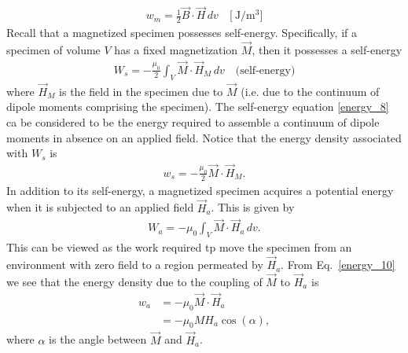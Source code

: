 \documentclass[12pt,a4paper,oneside]{book}
\begin{document}
\begin{onehalfspace}
\begin{equation}\label{energy_7}
	\boxed{	\begin{aligned}
			w_m = \frac{1}{2}\vec{B}\cdot \vec{H}\,dv \quad\Big[\SI{}{\joule\per\cubic\meter}\Big]
	\end{aligned}}
\end{equation}   
Recall that a magnetized specimen possesses self-energy. Specifically, if a specimen of volume $V$ has a fixed magnetization $\vec{M}$, then it possesses a self-energy 
\begin{equation}\label{energy_8}
	\boxed{	\begin{aligned}
			W_s = -\frac{\mu_0}{2}\int_{V}\vec{M}\cdot \vec{H}_M\,dv \quad\Big(\text{self-energy}\Big)
	\end{aligned}}
\end{equation} 
where $\vec{H}_M$ is the field in the specimen due to $\vec{M}$ (i.e. due to the continuum of dipole moments comprising the specimen). The self-energy equation \ref{energy_8} ca be considered to be the energy required to assemble a continuum of dipole moments in absence on an applied field. Notice that the energy density associated with $W_s$ is
\begin{equation}\label{energy_9}
	\begin{aligned}
			w_s = -\frac{\mu_0}{2}\vec{M}\cdot \vec{H}_M.
	\end{aligned}
\end{equation}
In addition to its self-energy, a magnetized specimen acquires a potential energy when it is subjected to an applied field $\vec{H}_a$. This is given by
\begin{equation}\label{energy_10}
\boxed{	\begin{aligned}
		W_a = -\mu_0\int_{V}\vec{M}\cdot \vec{H}_a\,dv.
	\end{aligned}}
\end{equation}
This can be viewed as the work required tp move the specimen from an environment with zero field to a region permeated by $\vec{H}_a$. From Eq.~\eqref{energy_10} we see that the energy density due to the coupling of $\vec{M}$ to $\vec{H}_a$ is
\begin{equation}\label{energy_11}
\begin{aligned}
	w_a &= -\mu_0 \vec{M}\cdot \vec{H}_a \\[6pt]
	&= -\mu_0 M H_a \cos(\alpha),
\end{aligned}
\end{equation}
where $\alpha$ is the angle between $\vec{M}$ and $\vec{H}_a$.

\end{onehalfspace}
\end{document}
